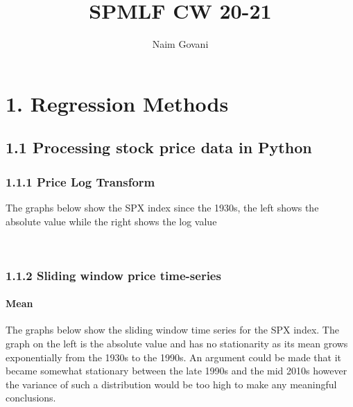 \documentclass[11pt]{article}
\title{SPMLF CW 20-21}
\begin{document}
    \author{Naim Govani}
    \maketitle
    
    

    
    \hypertarget{regression-methods}{%
\section{1. Regression Methods}\label{regression-methods}}

\hypertarget{processing-stock-price-data-in-python}{%
\subsection{1.1 Processing stock price data in
Python}\label{processing-stock-price-data-in-python}}

\hypertarget{price-log-transform}{%
\subsubsection{1.1.1 Price Log Transform}\label{price-log-transform}}

    The graphs below show the SPX index since the 1930s, the left shows the
absolute value while the right shows the log value

    \begin{center}
    \end{center}
    { \hspace*{\fill} \\}
    
    \hypertarget{sliding-window-price-time-series}{%
\subsubsection{1.1.2 Sliding window price
time-series}\label{sliding-window-price-time-series}}

\hypertarget{mean}{%
\paragraph{Mean}\label{mean}}

The graphs below show the sliding window time series for the SPX index.
The graph on the left is the absolute value and has no stationarity as
its mean grows exponentially from the 1930s to the 1990s. An argument
could be made that it became somewhat stationary between the late 1990s
and the mid 2010s however the variance of such a distribution would be
too high to make any meaningful conclusions.
\end{document}
